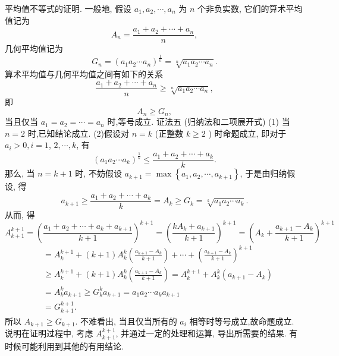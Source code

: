 平均值不等式的证明.
一般地, 假设 $a_1, a_2, \cdots, a_n$ 为 $n$ 个非负实数, 它们的算术平均值记为
$$
A_n=\frac{a_1+a_2+\cdots+a_n}{n},
$$
几何平均值记为
$$
G_n=\left(a_1 a_2 \cdots a_n\right)^{\frac{1}{n}}=\sqrt[n]{a_1 a_2 \cdots a_n} .
$$
算术平均值与几何平均值之间有如下的关系
$$
\frac{a_1+a_2+\cdots+a_n}{n} \geqslant \sqrt[n]{a_1 a_2 \cdots a_n},
$$
即
$$
A_n \geqslant G_n,
$$
当且仅当 $a_1=a_2=\cdots=a_n$ 时,等号成立.
证法五 (归纳法和二项展开式)
(1) 当 $n=2$ 时,已知结论成立.
(2)假设对 $n=k$ (正整数 $k \geqslant 2$ ) 时命题成立, 即对于 $a_i>0, i=1$, $2, \cdots, k$, 有
$$
\left(a_1 a_2 \cdots a_k\right)^{\frac{1}{k}} \leqslant \frac{a_1+a_2+\cdots+a_k}{k} .
$$
那么, 当 $n=k+1$ 时, 不妨假设 $a_{k+1}=\max \left\{a_1, a_2, \cdots, a_{k+1}\right\}$, 于是由归纳假设, 得
$$
a_{k+1} \geqslant \frac{a_1+a_2+\cdots+a_k}{k}=A_k \geqslant G_k=\sqrt[k]{a_1 a_2 \cdots a_k} .
$$
从而, 得
$$
A_{k+1}^{k+1}=\left(\frac{a_1+a_2+\cdots+a_k+a_{k+1}}{k+1}\right)^{k+1}=\left(\frac{k A_k+a_{k+1}}{k+1}\right)^{k+1}=\left(A_k+\frac{a_{k+1}-A_k}{k+1}\right)^{k+1}
$$
$$
\begin{aligned}
& =A_k^{k+1}+(k+1) A_k^k\left(\frac{a_{k+1}-A_k}{k+1}\right)+\cdots+\left(\frac{a_{k+1}-A_k}{k+1}\right)^{k+1} \\
& \geqslant A_k^{k+1}+(k+1) A_k^k\left(\frac{a_{k+1}-A_k}{k+1}\right)=A_k^{k+1}+A_k^k\left(a_{k+1}-A_k\right) \\
& =A_k^k a_{k+1} \geqslant G_k^k a_{k+1}=a_1 a_2 \cdots a_k a_{k+1} \\
& =G_{k+1}^{k+1} .
\end{aligned}
$$
所以 $A_{k+1} \geqslant G_{k+1}$.
不难看出, 当且仅当所有的 $a_i$ 相等时等号成立,故命题成立.
说明在证明过程中, 考虑 $A_{k+1}^{k+1}$, 并通过一定的处理和运算, 导出所需要的结果.
有时候可能利用到其他的有用结论.



